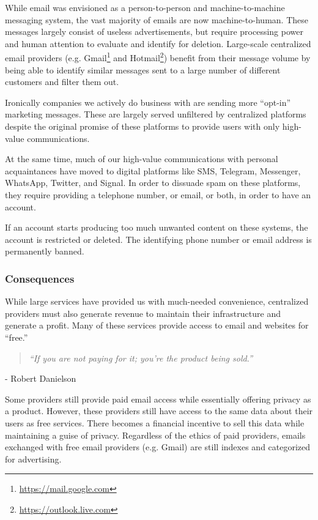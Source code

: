 \documentclass{article}
\newcommand{\chapquote}[2]{\begin{quotation} \textit{#1} \end{quotation} \begin{flushright} - #2\end{flushright} }
\begin{document}
While email was envisioned as a person-to-person and machine-to-machine messaging system, the vast majority of emails are now machine-to-human. These messages largely consist of useless advertisements, but require processing power and human attention to evaluate and identify for deletion. Large-scale centralized email providers (e.g. Gmail\footnote{\url{https://mail.google.com}} and Hotmail\footnote{\url{https://outlook.live.com}}) benefit from their message volume by being able to identify similar messages sent to a large number of different customers and filter them out.

Ironically companies we actively do business with are sending more ``opt-in'' marketing messages. These are largely served unfiltered by centralized platforms despite the original promise of these platforms to provide users with only high-value communications.

At the same time, much of our high-value communications with personal acquaintances have moved to digital platforms like SMS, Telegram, Messenger, WhatsApp, Twitter, and Signal. In order to dissuade spam on these platforms, they require providing a telephone number, or email, or both, in order to have an account.

If an account starts producing too much unwanted content on these systems, the account is restricted or deleted. The identifying phone number or email address is permanently banned.

\subsubsection{Consequences}

While large services have provided us with much-needed convenience, centralized providers must also generate revenue to maintain their infrastructure and generate a profit. Many of these services provide access to email and websites for ``free.''

\chapquote{\large ``If you are not paying for it; you're the product being sold.''}{Robert Danielson}

Some providers still provide paid email access while essentially offering privacy as a product. However, these providers still have access to the same data about their users as free services. There becomes a financial incentive to sell this data while maintaining a guise of privacy. Regardless of the ethics of paid providers, emails exchanged with free email providers (e.g. Gmail) are still indexes and categorized for advertising.
\end{document}
